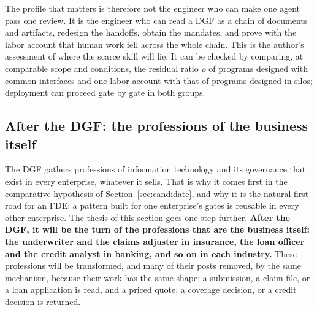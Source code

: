 The profile that matters is therefore not the engineer who can make one agent pass one review. It is
the engineer who can read a DGF as a chain of documents and artifacts, redesign the handoffs, obtain
the mandates, and prove with the labor account that human work fell across the whole chain. This is
the author's assessment of where the scarce skill will lie. It can be checked by comparing, at
comparable scope and conditions, the residual ratio $\rho$ of programs designed with common interfaces
and one labor account with that of programs designed in silos; deployment can proceed gate by gate in
both groups.

\subsection{After the DGF: the professions of the business itself}
\label{sec:afterdgf}

The DGF gathers professions of information technology and its governance that exist in every
enterprise, whatever it sells. That is why it comes first in the comparative hypothesis of
Section~\ref{sec:candidate}, and why it is the natural first road for an FDE: a pattern built for one
enterprise's gates is reusable in every other enterprise. The thesis of this section goes one step
further. \textbf{After the DGF, it will be the turn of the professions that are the business itself:
the underwriter and the claims adjuster in insurance, the loan officer and the credit analyst in
banking, and so on in each industry.} These professions will be transformed, and many of their posts
removed, by the same mechanism, because their work has the same shape: a submission, a claim file, or a
loan application is read, and a priced quote, a coverage decision, or a credit decision is returned.

